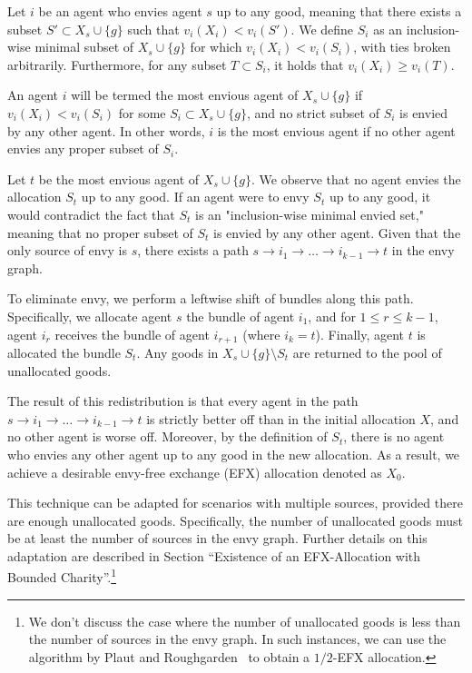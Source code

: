\documentclass{article}
\begin{document}
Let $i$ be an agent who envies agent $s$ up to any good, meaning that there exists a subset $S' \subset X_s \cup \{g\}$ such that $v_i(X_i) < v_i(S')$. We define $S_i$ as an inclusion-wise minimal subset of $X_s \cup \{g\}$ for which $v_i(X_i) < v_i(S_i)$, with ties broken arbitrarily. Furthermore, for any subset $T \subset S_i$, it holds that $v_i(X_i) \geq v_i(T)$.

An agent $i$ will be termed the most envious agent of $X_s \cup \{g\}$ if $v_i(X_i) < v_i(S_i)$ for some $S_i \subset X_s \cup \{g\}$, and no strict subset of $S_i$ is envied by any other agent. In other words, $i$ is the most envious agent if no other agent envies any proper subset of $S_i$.

Let $t$ be the most envious agent of $X_s \cup \{g\}$. We observe that no agent envies the allocation $S_t$ up to any good. If an agent were to envy $S_t$ up to any good, it would contradict the fact that $S_t$ is an "inclusion-wise minimal envied set," meaning that no proper subset of $S_t$ is envied by any other agent. Given that the only source of envy is $s$, there exists a path $s \rightarrow i_1 \rightarrow \ldots \rightarrow i_{k-1} \rightarrow t$ in the envy graph.

To eliminate envy, we perform a leftwise shift of bundles along this path. Specifically, we allocate agent $s$ the bundle of agent $i_1$, and for $1 \leq r \leq k - 1$, agent $i_r$ receives the bundle of agent $i_{r+1}$ (where $i_k = t$). Finally, agent $t$ is allocated the bundle $S_t$. Any goods in $X_s \cup \{g\} \setminus S_t$ are returned to the pool of unallocated goods.

The result of this redistribution is that every agent in the path $s \rightarrow i_1 \rightarrow \ldots \rightarrow i_{k-1} \rightarrow t$ is strictly better off than in the initial allocation $X$, and no other agent is worse off. Moreover, by the definition of $S_t$, there is no agent who envies any other agent up to any good in the new allocation. As a result, we achieve a desirable envy-free exchange (EFX) allocation denoted as $X_0$.

This technique can be adapted for scenarios with multiple sources, provided there are enough unallocated goods. Specifically, the number of unallocated goods must be at least the number of sources in the envy graph. Further details on this adaptation are described in Section “Existence of an EFX-Allocation with Bounded Charity”.\footnote{We don't discuss the case where the number of unallocated goods is less than the number of sources in the envy graph. In such instances, we can use the algorithm by Plaut and Roughgarden~\cite{DBLP:journals/corr/PlautR17} to obtain a $1/2$-EFX allocation.}
\end{document}
